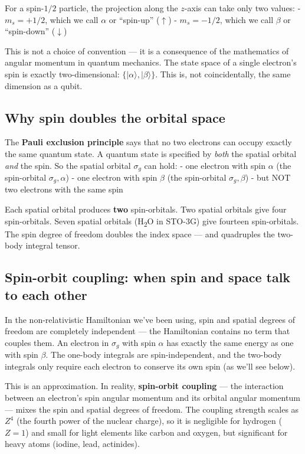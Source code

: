 \documentclass[
  11pt,
  oneside]{book}
\begin{document}
For a spin-\(1/2\) particle, the projection along the \(z\)-axis can
take only two values: - \(m_s = +1/2\), which we call \(\alpha\) or
``spin-up'' (\(\uparrow\)) - \(m_s = -1/2\), which we call \(\beta\) or
``spin-down'' (\(\downarrow\))

This is not a choice of convention --- it is a consequence of the
mathematics of angular momentum in quantum mechanics. The state space of
a single electron's spin is exactly two-dimensional:
\(\{\lvert\alpha\rangle, \lvert\beta\rangle\}\). This is, not
coincidentally, the same dimension as a qubit.

\subsection{Why spin doubles the orbital
space}\label{why-spin-doubles-the-orbital-space}

The \textbf{Pauli exclusion principle} says that no two electrons can
occupy exactly the same quantum state. A quantum state is specified by
\emph{both} the spatial orbital \emph{and} the spin. So the spatial
orbital \(\sigma_g\) can hold: - one electron with spin \(\alpha\) (the
spin-orbital \(\sigma_g, \alpha\)) - one electron with spin \(\beta\)
(the spin-orbital \(\sigma_g, \beta\)) - but NOT two electrons with the
same spin

Each spatial orbital produces \textbf{two} spin-orbitals. Two spatial
orbitals give four spin-orbitals. Seven spatial orbitals (H\textsubscript{2}O in STO-3G)
give fourteen spin-orbitals. The spin degree of freedom doubles the
index space --- and quadruples the two-body integral tensor.

\subsection{Spin-orbit coupling: when spin and space talk to each
other}\label{spin-orbit-coupling-when-spin-and-space-talk-to-each-other}

In the non-relativistic Hamiltonian we've been using, spin and spatial
degrees of freedom are completely independent --- the Hamiltonian
contains no term that couples them. An electron in \(\sigma_g\) with
spin \(\alpha\) has exactly the same energy as one with spin \(\beta\).
The one-body integrals are spin-independent, and the two-body integrals
only require each electron to conserve its own spin (as we'll see
below).

This is an approximation. In reality, \textbf{spin-orbit coupling} ---
the interaction between an electron's spin angular momentum and its
orbital angular momentum --- mixes the spin and spatial degrees of
freedom. The coupling strength scales as \(Z^4\) (the fourth power of
the nuclear charge), so it is negligible for hydrogen (\(Z=1\)) and
small for light elements like carbon and oxygen, but significant for
heavy atoms (iodine, lead, actinides).
\end{document}
